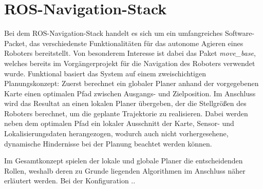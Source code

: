 \chapter{ROS-Navigation-Stack}
Bei dem ROS-Navigation-Stack handelt es sich um ein umfangreiches Software-Packet, das verschiedenste Funktionalitäten für das autonome Agieren eines Roboters bereitstellt. Von besonderem Interesse ist dabei das Paket \textit{move\_base}, welches bereits im Vorgängerprojekt für die Navigation des Roboters verwendet wurde. Funktional basiert das System auf einem zweischichtigen Planungskonzept: Zuerst berechnet ein globaler Planer anhand der vorgegebenen Karte einen optimalen Pfad zwischen Ausgangs- und Zielposition. Im Anschluss wird das Resultat an einen lokalen Planer übergeben, der die Stellgrößen des Roboters berechnet, um die geplante Trajektorie zu realisieren. Dabei werden neben dem optimalen Pfad ein lokaler Ausschnitt der Karte, Sensor- und Lokalisierungsdaten herangezogen, wodurch auch nicht vorhergesehene, dynamische Hindernisse bei der Planung beachtet werden können.

Im Gesamtkonzept spielen der lokale und globale Planer die entscheidenden Rollen, weshalb deren zu Grunde liegenden Algorithmen im Anschluss näher erläutert werden. Bei der Konfiguration ..

\newpage


\newpage
